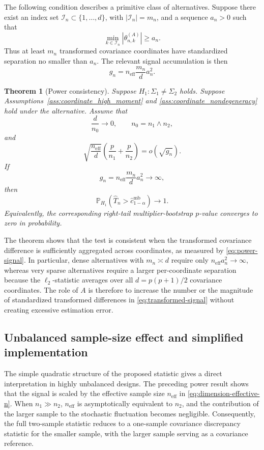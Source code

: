 \documentclass[
  12pt]{article}
\theoremstyle{plain}
\newtheorem{theorem}{Theorem}[section]
\theoremstyle{definition}
\theoremstyle{remark}
\begin{document}
The following condition describes a primitive class of alternatives.  Suppose
there exist an index set \(\mathcal I_n\subset\{1,\ldots,d\}\), with
\(|\mathcal I_n|=m_n\), and a sequence \(a_n>0\) such that
\[
\min_{k\in\mathcal I_n}
\left|
\theta_{n,k}^{(A)}
\right|
\ge a_n.
\]
Thus at least \(m_n\) transformed covariance coordinates have standardized
separation no smaller than \(a_n\).  The relevant signal accumulation is then
\begin{equation}
\label{eq:power-signal}
g_n
=
n_{\mathrm{eff}}\frac{m_n}{d}a_n^2.
\end{equation}

\begin{theorem}[Power consistency]
\label{thm:power_consistency}
Suppose \(H_1:\Sigma_1\neq\Sigma_2\) holds.  Suppose
Assumptions~\ref{ass:coordinate_high_moment} and
\ref{ass:coordinate_nondegeneracy} hold under the alternative.  Assume that
\[
\frac{d}{n_0}\to0,
\qquad
n_0=n_1\wedge n_2,
\]
and
\[
\sqrt{\frac{n_{\mathrm{eff}}}{d}}
\left(
\frac{p}{n_1}+\frac{p}{n_2}
\right)
=
o(\sqrt{g_n}).
\]
If
\[
g_n
=
n_{\mathrm{eff}}\frac{m_n}{d}a_n^2
\to\infty,
\]
then
\[
\mathbb P_{H_1}
\left(
\widehat T_n>\widehat c_{1-\alpha}^{\mathrm{mb}}
\right)
\to1.
\]
Equivalently, the corresponding right-tail multiplier-bootstrap \(p\)-value
converges to zero in probability.
\end{theorem}

The theorem shows that the test is consistent when the transformed covariance
difference is sufficiently aggregated across coordinates, as measured by
\eqref{eq:power-signal}.  In particular, dense alternatives with
\(m_n\asymp d\) require only \(n_{\mathrm{eff}}a_n^2\to\infty\), whereas very
sparse alternatives require a larger per-coordinate separation because the
\(\ell_2\)-statistic averages over all \(d=p(p+1)/2\) covariance coordinates.
The role of \(A\) is therefore to increase the number or the magnitude of
standardized transformed differences in \eqref{eq:transformed-signal} without
creating excessive estimation error.

\subsection{Unbalanced sample-size effect and simplified implementation}
\label{subsec:unbalanced_effect}

The simple quadratic structure of the proposed statistic gives a direct
interpretation in highly unbalanced designs.  The preceding power result shows
that the signal is scaled by the effective sample size \(n_{\mathrm{eff}}\) in
\eqref{eq:dimension-effective-n}.
When \(n_1\gg n_2\), \(n_{\mathrm{eff}}\) is asymptotically equivalent to
\(n_2\), and the contribution of the larger sample to the stochastic fluctuation
becomes negligible.  Consequently, the full two-sample statistic reduces to a
one-sample covariance discrepancy statistic for the smaller sample, with the
larger sample serving as a covariance reference.
\end{document}
